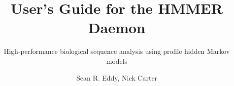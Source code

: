 \title{User's Guide for the HMMER Daemon}

\subtitle{High-performance biological sequence analysis using profile hidden Markov models}

\author{Sean R. Eddy, Nick Carter}


